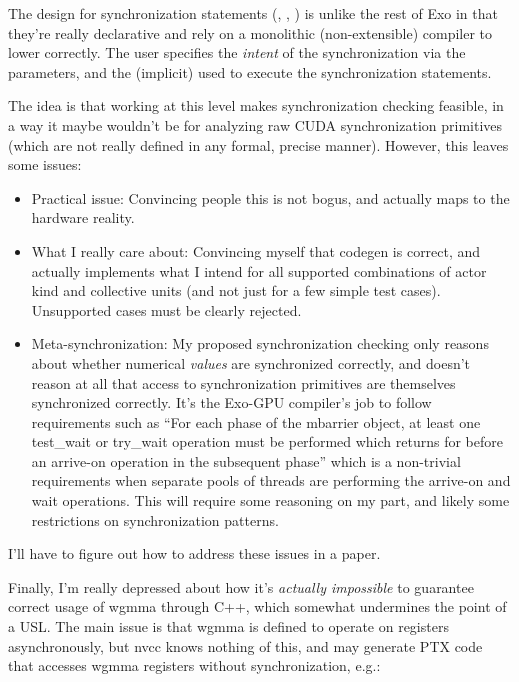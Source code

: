 \filbreak
{}

The design for synchronization statements (, , ) is unlike the rest of Exo in that they're really declarative and rely on a monolithic (non-extensible) compiler to lower correctly.
The user specifies the \textit{intent} of the synchronization via the  parameters, and the (implicit)  used to execute the synchronization statements.

\filbreak
The idea is that working at this level makes synchronization checking feasible, in a way it maybe wouldn't be for analyzing raw CUDA synchronization primitives (which are not really defined in any formal, precise manner).
However, this leaves some issues:

\filbreak
\begin{itemize}
  \item Practical issue: Convincing people this is not bogus, and actually maps to the hardware reality.
  \filbreak
  \item What I really care about: Convincing myself that codegen is correct, and actually implements what I intend for all supported combinations of actor kind and collective units (and not just for a few simple test cases).
  Unsupported cases must be clearly rejected.
  \filbreak
  \item Meta-synchronization: My proposed synchronization checking only reasons about whether numerical \textit{values} are synchronized correctly, and doesn't reason at all that access to synchronization primitives are themselves synchronized correctly.
    It's the Exo-GPU compiler's job to follow requirements such as ``For each phase of the mbarrier object, at least one test\_wait or try\_wait operation must be performed which returns  for  before an arrive-on operation in the subsequent phase'' which is a non-trivial requirements when separate pools of threads are performing the arrive-on and wait operations.
    This will require some reasoning on my part, and likely some restrictions on synchronization patterns.
\end{itemize}

\filbreak
I'll have to figure out how to address these issues in a paper.

\filbreak
Finally, I'm really depressed about how it's \textit{actually impossible} to guarantee correct usage of wgmma through C++, which somewhat undermines the point of a USL.
The main issue is that wgmma is defined to operate on registers asynchronously, but nvcc knows nothing of this, and may generate PTX code that accesses wgmma registers without synchronization, e.g.:

